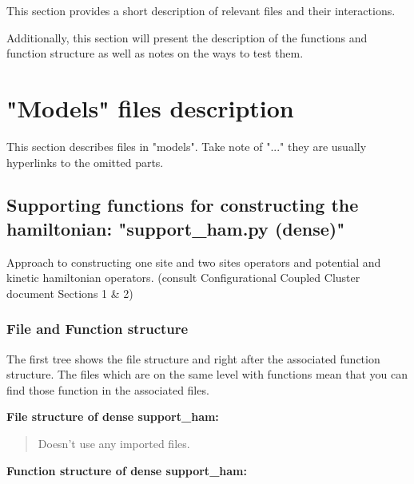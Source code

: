 \documentclass[a4paper,10pt]{article}
\begin{document}
This section provides a short description of relevant files and their interactions.

Additionally, this section will present the description of the functions and function structure as well as notes on the ways to test them.





\section{"Models" files description}

This section describes files in "models". Take note of "..." they are usually hyperlinks to the omitted parts.




\subsection{Supporting functions for constructing the hamiltonian: "support\_ham.py (dense)"}

Approach to constructing one site and two sites operators and potential and kinetic hamiltonian operators. (consult Configurational Coupled Cluster document Sections 1 \& 2)



\subsubsection{File and Function structure}

The first tree shows the file structure and right after the associated function structure. The files which are on the same level with functions mean that you can find those function in the associated files.


\textbf{\newline File structure of dense support\_ham: \newline}

\begin{quote}
  Doesn't use any imported files.
\end{quote}


\textbf{\newline Function structure of dense support\_ham: \newline}
\end{document}
